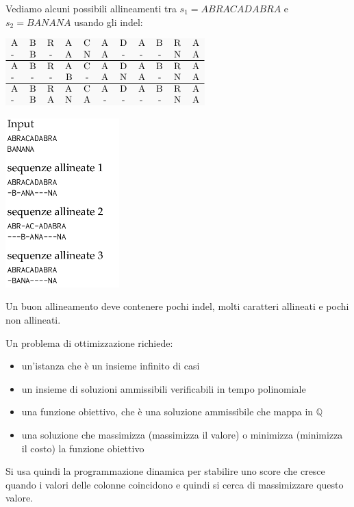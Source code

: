 \documentclass[a4paper,12pt, oneside]{book}
\begin{document}
\begin{esempio}
  Vediamo alcuni possibili allineamenti tra $s_1=ABRACADABRA$ e
  $s_2=BANANA$ usando gli indel:
  \begin{center}
    \includegraphics[scale = 0.5]{img/al.png}
  \end{center}
  \begin{center}
  \includegraphics[scale = 0.7]{img/indel.png}
\end{center}
\end{esempio}
Un buon allineamento deve contenere pochi indel, molti caratteri
allineati e pochi non allineati.\\
\begin{definizione}
  Un problema di ottimizzazione richiede:
  \begin{itemize}
    \item un'istanza che è un insieme infinito di casi
    \item un insieme di soluzioni ammissibili verificabili in tempo
    polinomiale
    \item una funzione obiettivo, che è una soluzione ammissibile che
    mappa in $\mathbb{Q}$
    \item una soluzione che massimizza (massimizza il valore) o
    minimizza (minimizza il costo) la funzione obiettivo
  \end{itemize}
\end{definizione}
Si usa quindi la programmazione dinamica per stabilire uno score che
cresce quando i valori delle colonne coincidono e quindi si cerca di
massimizzare questo valore.\\
\end{document}
